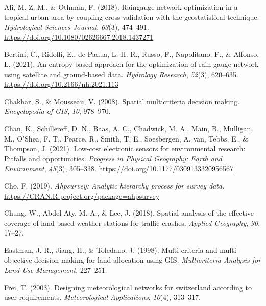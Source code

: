 \documentclass[spanish]{article}
\newlength{\cslhangindent}
\newlength{\cslentryspacingunit} %
\newenvironment{CSLReferences}[2] %
 {%
  \setlength{\parindent}{0pt}
  \ifodd #1
  \let\oldpar\par
  \def\par{\hangindent=\cslhangindent\oldpar}
  \fi
  \setlength{\parskip}{#2\cslentryspacingunit}
 }%
 {}
\begin{document}
\hypertarget{refs}{}
\begin{CSLReferences}{1}{0}
\leavevmode{}%
Ali, M. Z. M., \& Othman, F. (2018). Raingauge network optimization in a
tropical urban area by coupling cross-validation with the geostatistical
technique. \emph{Hydrological Sciences Journal}, \emph{63}(3), 474--491.
\url{https://doi.org/10.1080/02626667.2018.1437271}

\leavevmode{}%
Bertini, C., Ridolfi, E., de Padua, L. H. R., Russo, F., Napolitano, F.,
\& Alfonso, L. (2021). An entropy-based approach for the optimization of
rain gauge network using satellite and ground-based data.
\emph{Hydrology Research}, \emph{52}(3), 620--635.
\url{https://doi.org/10.2166/nh.2021.113}

\leavevmode{}%
Chakhar, S., \& Mousseau, V. (2008). Spatial multicriteria decision
making. \emph{Encyclopedia of GIS}, \emph{10}, 978--970.

\leavevmode{}%
Chan, K., Schillereff, D. N., Baas, A. C., Chadwick, M. A., Main, B.,
Mulligan, M., O'Shea, F. T., Pearce, R., Smith, T. E., Soesbergen, A.
van, Tebbs, E., \& Thompson, J. (2021). Low-cost electronic sensors for
environmental research: Pitfalls and opportunities. \emph{Progress in
Physical Geography: Earth and Environment}, \emph{45}(3), 305--338.
\url{https://doi.org/10.1177/0309133320956567}

\leavevmode{}%
Cho, F. (2019). \emph{Ahpsurvey: Analytic hierarchy process for survey
data}. \url{https://CRAN.R-project.org/package=ahpsurvey}

\leavevmode{}%
Chung, W., Abdel-Aty, M. A., \& Lee, J. (2018). Spatial analysis of the
effective coverage of land-based weather stations for traffic crashes.
\emph{Applied Geography}, \emph{90}, 17--27.

\leavevmode{}%
Eastman, J. R., Jiang, H., \& Toledano, J. (1998). Multi-criteria and
multi-objective decision making for land allocation using GIS.
\emph{Multicriteria Analysis for Land-Use Management}, 227--251.

\leavevmode{}%
Frei, T. (2003). Designing meteorological networks for switzerland
according to user requirements. \emph{Meteorological Applications},
\emph{10}(4), 313--317.


\end{CSLReferences}
\end{document}
